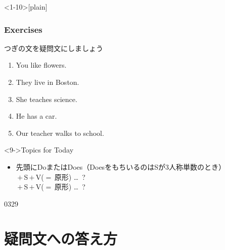\documentclass[aspectratio=169,dvipsnames]{beamer}
\newcommand{\myaudio}[1]{\href{#1}{\faVolumeUp}}
\begin{document}
\begin{frame}<1-10>[plain]\frametitle{Exercises}

つぎの文を疑問文にしましょう

 \begin{enumerate}
  \item<1-> You like flowers.\hspace{59.7pt}
  \item<1-> They live in Boston.\hspace{47.5pt}%
  \item<1-> She teaches science.\hspace{42pt}%
  \item<5-> He has  a car.\hspace{80.5pt}%
  \item<7-> Our teacher walks to school.
 \end{enumerate}

\begin{block}<9->{Topics for Today}\small
\begin{itemize}[square]
 \item   先頭にDoまたはDoes（DoesをもちいるのはSが3人称単数のとき）\\
	 \,$+$\,S\,$+$\,V{\scriptsize ($=$\,原形)} \ldots\,\,\,?\\
	 \,$+$\,S\,$+$\,V{\scriptsize ($=$\,原形)} \ldots\,\,\,?
\end{itemize}
     \end{block}

\vspace{-10pt}

\hfill{\tiny 0329}\,{\scriptsize \myaudio{./audio/010_question_do_06.mp3}}

\end{frame}
\section{疑問文への答え方}
\end{document}
